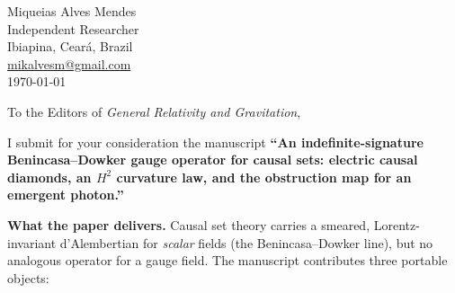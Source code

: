 \documentclass[11pt]{article}
\begin{document}
\begin{flushright}
Miqueias Alves Mendes\\
Independent Researcher\\
Ibiapina, Cear\'a, Brazil\\
\href{mailto:mikalvesm@gmail.com}{mikalvesm@gmail.com}\\[4pt]
\today
\end{flushright}

\vspace{6pt}
\noindent To the Editors of \emph{General Relativity and Gravitation},

\vspace{6pt}
I submit for your consideration the manuscript \textbf{``An indefinite-signature
Benincasa--Dowker gauge operator for causal sets: electric causal diamonds, an
$H^2$ curvature law, and the obstruction map for an emergent photon.''}

\textbf{What the paper delivers.} Causal set theory carries a smeared,
Lorentz-invariant d'Alembertian for \emph{scalar} fields (the Benincasa--Dowker
line), but no analogous operator for a gauge field. The manuscript contributes
three portable objects:
\end{document}
